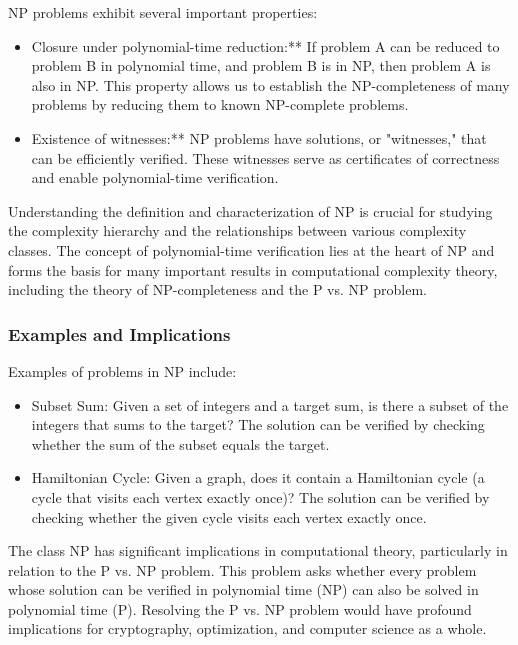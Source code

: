 \documentclass[12pt]{book} %
\begin{document}
NP problems exhibit several important properties:
\begin{itemize}
    \item Closure under polynomial-time reduction:** If problem A can be reduced to problem B in polynomial time, and problem B is in NP, then problem A is also in NP. This property allows us to establish the NP-completeness of many problems by reducing them to known NP-complete problems.

\item Existence of witnesses:** NP problems have solutions, or "witnesses," that can be efficiently verified. These witnesses serve as certificates of correctness and enable polynomial-time verification.

\end{itemize}
Understanding the definition and characterization of NP is crucial for studying the complexity hierarchy and the relationships between various complexity classes. The concept of polynomial-time verification lies at the heart of NP and forms the basis for many important results in computational complexity theory, including the theory of NP-completeness and the P vs. NP problem.

\subsubsection{Examples and Implications}
Examples of problems in NP include:
\begin{itemize}
    \item Subset Sum: Given a set of integers and a target sum, is there a subset of the integers that sums to the target? The solution can be verified by checking whether the sum of the subset equals the target.

\item Hamiltonian Cycle: Given a graph, does it contain a Hamiltonian cycle (a cycle that visits each vertex exactly once)? The solution can be verified by checking whether the given cycle visits each vertex exactly once.
\end{itemize}

The class NP has significant implications in computational theory, particularly in relation to the P vs. NP problem. This problem asks whether every problem whose solution can be verified in polynomial time (NP) can also be solved in polynomial time (P). Resolving the P vs. NP problem would have profound implications for cryptography, optimization, and computer science as a whole.
\end{document}
